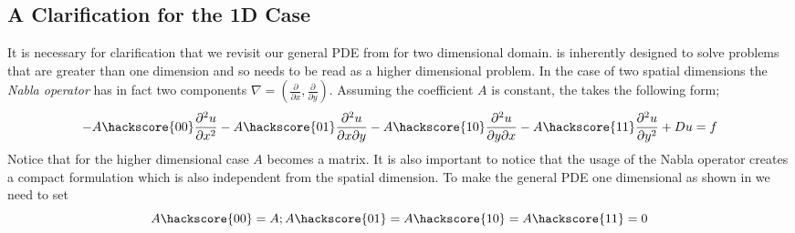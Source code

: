 \subsection{A Clarification for the 1D Case}
\label{SEC: 1D CLARIFICATION}
It is necessary for clarification that we revisit our general PDE from  for two dimensional domain. \esc is inherently designed to solve problems that are greater than one dimension and so  needs to be read as a higher dimensional problem. In the case of two spatial dimensions the \textit{Nabla operator} has in fact two components $\nabla = (\frac{\partial}{\partial x}, \frac{\partial}{\partial y})$. Assuming the coefficient $A$ is constant, the  takes the following form;
\begin{equation}\label{eqn:commonform2D}
-A\hackscore{00}\frac{\partial^{2}u}{\partial x^{2}} 
-A\hackscore{01}\frac{\partial^{2}u}{\partial x\partial y} 
-A\hackscore{10}\frac{\partial^{2}u}{\partial y\partial x} 
-A\hackscore{11}\frac{\partial^{2}u}{\partial y^{2}} 
+ Du = f
\end{equation}
Notice that for the higher dimensional case $A$ becomes a matrix. It is also
important to notice that the usage of the Nabla operator creates
a compact formulation which is also independent from the spatial dimension. 
To make the general PDE  one dimensional as
shown in  we need to set
\begin{equation}
A\hackscore{00}=A; A\hackscore{01}=A\hackscore{10}=A\hackscore{11}=0
\end{equation}


